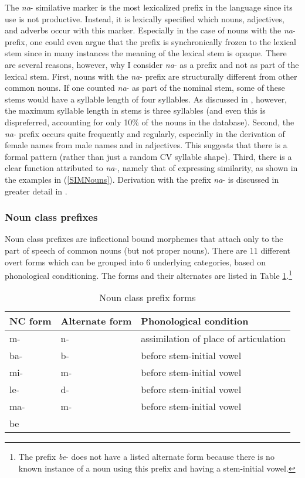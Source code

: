 The {\itshape na}- similative marker is the most lexicalized prefix in the language since its use is not productive. Instead,  it is lexically specified which nouns, adjectives, and adverbs occur with this marker.  Especially in the case of nouns with the {\itshape na}- prefix, one could even argue that the prefix is synchronically frozen to the lexical stem since in many instances the meaning of the lexical stem is opaque.  There are several reasons, however, why I consider {\itshape na}- as a prefix and not as part of the lexical stem.  First, nouns with the {\itshape na}- prefix are structurally different from other common nouns. If one counted {\itshape na}- as part of the nominal stem, some of these stems would have a syllable length of four syllables. As discussed in , however, the maximum syllable length in stems is three syllables (and even this is dispreferred, accounting for only 10\% of the nouns in the database).  Second,  the {\itshape na}- prefix occurs quite frequently and regularly, especially in the derivation of female names from male names and in adjectives. This suggests that there is a formal pattern (rather than just a random CV syllable shape).   Third,  there is a clear function attributed to {\itshape na}-, namely that of expressing similarity, as shown in the examples in (\ref{SIMNouns}).  Derivation with the prefix {\itshape na}- is discussed in greater detail in .



\subsubsection{Noun class prefixes}
\label{sec:NCPre}

Noun class prefixes are inflectional bound morphemes that attach only to the part of speech of common nouns (but not proper nouns). There are 11 different overt forms which can be grouped into 6 underlying categories, based on phonological conditioning. The forms and their alternates are listed in Table \ref{Tab:NCmorph}.\footnote{The prefix {\itshape be}- does not have a listed alternate form because there is no known instance of a noun using this prefix and having a stem-initial vowel.} 

\begin{table}[!h]
\centering
\begin{tabular}{ll|l}
 \midrule 
NC form & Alternate form  & Phonological condition \\
 \midrule
m- & n- &  assimilation of place of articulation \\
ba- & b- & before stem-initial vowel \\ 
mi- & m- & before stem-initial vowel \\
le- & d- &  before stem-initial vowel \\
ma- & m- & before stem-initial vowel \\
be & & \\
 \midrule
\end{tabular}
\caption{Noun class prefix forms}
\label{Tab:NCmorph}
\end{table} 

